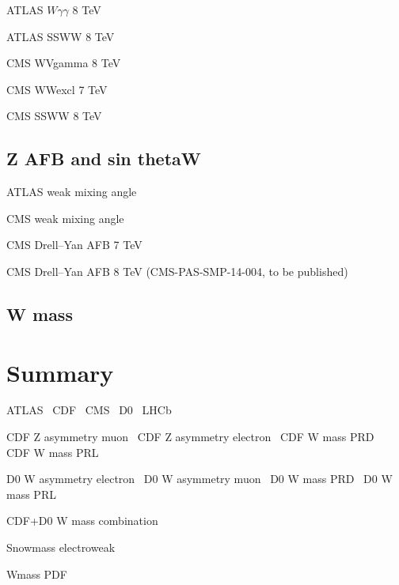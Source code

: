 \documentclass[12pt]{iopart}
\begin{document}
ATLAS $W\gamma\gamma$ 8 TeV~\cite{Aad:2015uqa}

ATLAS SSWW 8 TeV~\cite{Aad:2014zda}

CMS WVgamma 8 TeV~\cite{Chatrchyan:2014bza}

CMS WWexcl 7 TeV~\cite{Chatrchyan:2013foa}

CMS SSWW 8 TeV~\cite{Khachatryan:2014sta}

\subsection{Z AFB and sin thetaW}

ATLAS weak mixing angle~\cite{Aad:2015uau}

CMS weak mixing angle~\cite{Chatrchyan:2011ya}

CMS Drell--Yan AFB 7 TeV~\cite{Chatrchyan:2012dc}

CMS Drell--Yan AFB 8 TeV (CMS-PAS-SMP-14-004, to be published)

\subsection{W mass}

\section{Summary}


ATLAS~\cite{Aad:2008zzm}
CDF~\cite{Abulencia:2005ix}
CMS~\cite{CMSdetector}
D0~\cite{Abazov:2005pn}
LHCb~\cite{Alves:2008zz}

CDF Z asymmetry muon~\cite{Aaltonen:2014loa}
CDF Z asymmetry electron~\cite{Aaltonen:2013wcp}
CDF W mass PRD~\cite{Aaltonen:2013vwa}
CDF W mass PRL~\cite{Aaltonen:2012bp}

D0 W asymmetry electron~\cite{Abazov:2013dsa}
D0 W asymmetry muon~\cite{Abazov:2013rja}
D0 W mass PRD~\cite{D0:2013jba}
D0 W mass PRL~\cite{Abazov:2012bv}

CDF+D0 W mass combination~\cite{Aaltonen:2013iut}

Snowmass electroweak~\cite{Baak:2013fwa}

Wmass PDF~\cite{Bozzi:2011ww}



\end{document}
